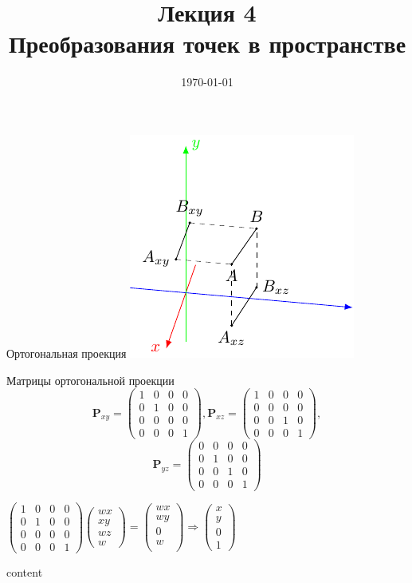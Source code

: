 \documentclass[10pt]{beamer}
\date{\today}
\title{Лекция 4 \\Преобразования точек в пространстве}
\begin{document}
	


\begin{frame}{Ортогональная проекция}
	{\includegraphics{line_ortho.pdf}
	}
	{
		\begin{block}{Матрицы ортогональной проекции}
			$$
			\mathbf P_{xy}=
			\begin{pmatrix}				
					1&0&0&0\\
					0&1&0&0\\
					0&0&0&0\\
					0&0&0&1		
			\end{pmatrix},							
			\mathbf P_{xz}=
			\begin{pmatrix}				
				1&0&0&0\\
				0&0&0&0\\
				0&0&1&0\\
				0&0&0&1		
			\end{pmatrix}, $$  $$		
			\mathbf P_{yz}=
			\begin{pmatrix}				
				0&0&0&0\\
				0&1&0&0\\
				0&0&1&0\\
				0&0&0&1		
			\end{pmatrix}		
			$$
			
		\end{block}
	}
	
	\pause
	
	$\begin{pmatrix}				
		1&0&0&0\\
		0&1&0&0\\
		0&0&0&0\\
		0&0&0&1		
	\end{pmatrix}
	\begin{pmatrix}
		wx\\
		xy\\
		wz\\
		w
	\end{pmatrix}
	=
	\begin{pmatrix}
		wx\\
		wy\\
		0\\
		w\\
	\end{pmatrix}
	\Rightarrow
	\begin{pmatrix}
		x\\
		y\\
		0\\
		1
	\end{pmatrix}
	$
	
\end{frame}

\begin{frame}
	content
\end{frame}
 		 
\end{document}
